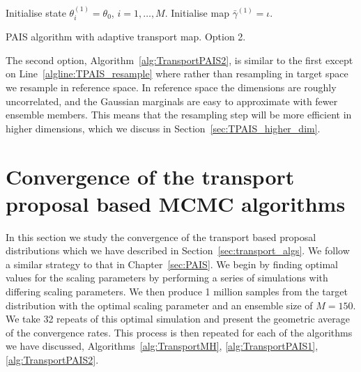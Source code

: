 \documentclass[final]{siamltex}
\begin{document}
\begin{table}
\begin{algorithm}[H]
\DontPrintSemicolon
\BlankLine
Initialise state $\theta^{(1)}_i = \theta_0$, \quad $i = 1,\dots,M$.\;
Initialise map $\bar{\gamma}^{(1)} = \iota$.\;
\caption{PAIS algorithm with adaptive transport map. Option 2.\label{alg:TransportPAIS2}}
\end{algorithm}
\end{table}

The second option, Algorithm~\ref{alg:TransportPAIS2}, is similar to the first except on Line~\ref{algline:TPAIS_resample} where rather than resampling in target space we resample in reference space. In reference space the dimensions are roughly uncorrelated, and the Gaussian marginals are easy to approximate with fewer ensemble members. This means that the resampling step will be more efficient in higher dimensions, which we discuss in Section~\ref{sec:TPAIS_higher_dim}.

\section[Convergence of transport MCMC]{Convergence of the transport proposal based MCMC algorithms}

In this section we study the convergence of the transport based proposal distributions which we have described in Section~\ref{sec:transport_algs}. We follow a similar strategy to that in Chapter~\ref{sec:PAIS}. We begin by finding optimal values for the scaling parameters by performing a series of simulations with differing scaling parameters. We then produce 1 million samples from the target distribution with the optimal scaling parameter and an ensemble size of $M=150$. We take 32 repeats of this optimal simulation and present the geometric average of the convergence rates. This process is then repeated for each of the algorithms we have discussed, Algorithms~\ref{alg:TransportMH}, \ref{alg:TransportPAIS1}, \ref{alg:TransportPAIS2}.
\end{document}

